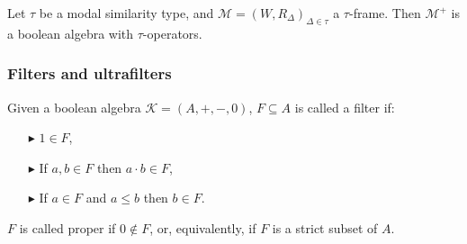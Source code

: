 \documentclass[10pt]{beamer}
\theoremstyle{definition}
\theoremstyle{definition}
\begin{document}
\begin{frame}\label{frame: complex alg are BAO}

\begin{lemma}
Let $\tau$ be a modal similarity type, and $\mathcal{M} = (W, R_{\Delta})_{\Delta \in \tau}$ a 
$\tau$-frame. Then $\mathcal{M}^+$ is a boolean algebra with $\tau$-operators.
\end{lemma}


\end{frame}


\begin{frame}\label{frame: filters and ultrafilters}

\frametitle{Filters and ultrafilters}

\begin{definition}[Filter]\label{defn: filter}
Given a boolean algebra $\mathcal{K} = (A,+,-,0)$, $F\subseteq A$ is called a filter if:
\begin{enumerate}
\item[$\blacktriangleright$] $1 \in F$,
\item[$\blacktriangleright$] If $a,b \in F$ then $a \cdot b \in F$,
\item[$\blacktriangleright$] If $a \in F$ and $a \leq b$ then $b \in F$.
\end{enumerate}
$F$ is called proper if $0 \notin F$, or, equivalently, if $F$ is a strict subset of $A$.
\end{definition}


\end{frame}
\end{document}
